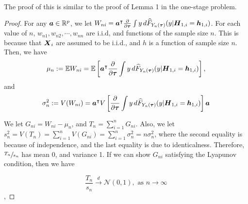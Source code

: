 \documentclass[../main.tex]{subfiles}
\begin{document}
The proof of this is similar to the proof of Lemma 1 in the one-stage problem.

%
%

\begin{proof}
For any  $\boldsymbol{a} \in \mathbb{R}^p$, we let $W_{ni} = \bs{a}^\itl \pard[\bs{\tau}]\int y \,d  \wh{F}_{Y_n(\bs{\tau})}(y | \bs{H}_{1,i} = \bs{h}_{1,i})$. For each value of $n$, $w_{n1},w_{n2},\cdots,w_{nn}$ are i.i.d, and functions of the sample size $n$. This is because that $\boldsymbol{X}_{i}$ are assumed to be i.i.d., and $h$ is a function of sample
size $n$. Then, we have
\begin{gather*}
\mu_{n}:=\mathbb{E}W_{ni}=\mathbb{E}\lt[\bs{a}^\itl \pard[\bs{\tau}]\int y \,d  \wh{F}_{Y_n(\bs{\tau})}(y | \bs{H}_{1,i} = \bs{h}_{1,i})\rt],
\end{gather*}
and 
\begin{gather*}
\sigma_{n}^{2}:=V(W_{ni})=\bs{a}^\itl V\lt[\pard[\bs{\tau}]\int y \,d  \wh{F}_{Y_n(\bs{\tau})}(y | \bs{H}_{1,i} = \bs{h}_{1,i}) \rt]\bs{a}
\end{gather*}

We let $G_{ni}=W_{ni}-\mu_{\ensuremath{n}}$, and $T_{n}=\sum_{i=1}^{n}G_{ni}$. Also, we let $s_{n}^{2}=V(T_{n})=\sum_{i=1}^{n}V(G_{ni})=\sum_{i=1}^{n}\sigma_{n}^{2}=n\sigma_{n}^{2}$, where the second equality is because of independence, and the last equality is due to identicalness. Therefore, $\sfrac{T_{n}}{s_{n}}$ has mean 0, and variance 1.  If we can show $G_{ni}$ satisfying the Lyapunov condition, then
we have

$$\frac{T_{n}}{s_{n}}\overset{d}{\to}\mathcal{N}(0,1),\text{ as } n \to \infty$$,




\end{proof}
\end{document}
